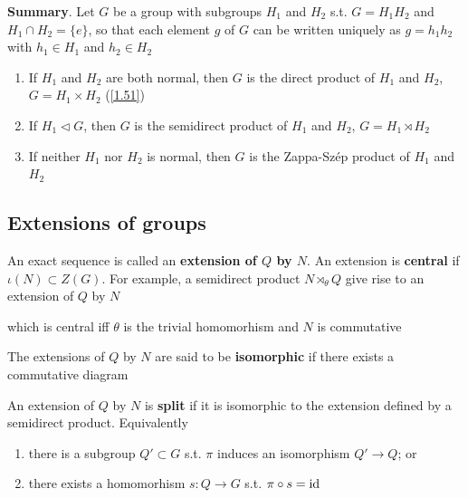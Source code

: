 \documentclass[11pt]{article}
\begin{document}
\textbf{Summary}. Let \(G\) be a group with subgroups \(H_1\) and \(H_2\) s.t. \(G=H_1H_2\)
 and \(H_1\cap H_2=\{e\}\), so that each element \(g\) of \(G\) can be written uniquely as \(g=h_1h_2\)
 with \(h_1\in H_1\) and \(h_2\in H_2\)
\begin{enumerate}
\item If \(H_1\) and \(H_2\) are both normal, then \(G\) is the direct product of \(H_1\)
and \(H_2\), \(G=H_1\times H_2\) (\ref{1.51})
\item If \(H_1\lhd G\), then \(G\) is the semidirect product of \(H_1\) and \(H_2\), \(G=H_1\rtimes H_2\)
\item If neither \(H_1\) nor \(H_2\) is normal, then \(G\) is the Zappa-Szép product of \(H_1\)
and \(H_2\)
\end{enumerate}
\subsection{Extensions of groups}
\label{sec:org6788a83}
\begin{center}\end{center}
An exact sequence is called an \textbf{extension of \(Q\) by \(N\)}. An extension is \textbf{central}
if \(\iota(N)\subset Z(G)\). For example, a semidirect product \(N\rtimes_\theta Q\) give rise to an extension
of \(Q\) by \(N\)
\begin{center}\end{center}
which is central iff \(\theta\) is the trivial homomorhism and \(N\) is commutative

The extensions of \(Q\) by \(N\) are said to be \textbf{isomorphic} if there exists a commutative diagram
\begin{center}\end{center}
An extension of \(Q\) by \(N\) is \textbf{split} if it is isomorphic to the extension defined by a
semidirect product. Equivalently
\begin{enumerate}
\item there is a subgroup \(Q'\subset G\) s.t. \(\pi\) induces an isomorphism \(Q'\to Q\); or
\item there exists a homomorhism \(s:Q\to G\) s.t. \(\pi\circ s=\operatorname{id}\)
\end{enumerate}
\end{document}
